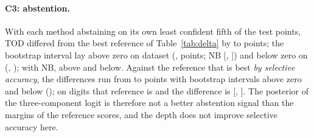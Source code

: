 \documentclass[10pt,a4paper]{article}
\theoremstyle{plain}
\theoremstyle{definition}
\theoremstyle{remark}
\newcommand{\meth}[1]{\textsf{#1}}
\begin{document}
\paragraph{C3: abstention.} With each method abstaining on its own least confident fifth of the test points, \meth{TOD} differed from the best reference of Table~\ref{tab:delta} by \SelDeltaMin{} to \SelDeltaMax{} points; the bootstrap interval lay above zero on \NSelCiAboveZero{} dataset (\SelAboveList, \SelDeltaBestDigits{} points; NB [\SelNbLoDigits, \SelNbHiDigits]) and below zero on \NSelCiBelowZero{} (\SelBelowList, \SelDeltaBestMoons); with NB, \NSelNbAboveZero{} above and \NSelNbBelowZero{} below. Against the reference that is best \emph{by selective accuracy}, the differences run from \SelBySelDeltaMin{} to \SelBySelDeltaMax{} points with \NSelBySelCiAboveZero{} bootstrap intervals above zero and \NSelBySelCiBelowZero{} below (\SelBySelBelowList); on digits that reference is \meth{\SelBySelRefDigits} and the difference is \SelBySelDeltaDigits{} [\SelBySelLoDigits, \SelBySelHiDigits]. The posterior of the three-component logit is therefore not a better abstention signal than the margins of the reference scores, and the depth does not improve selective accuracy here.
\end{document}
